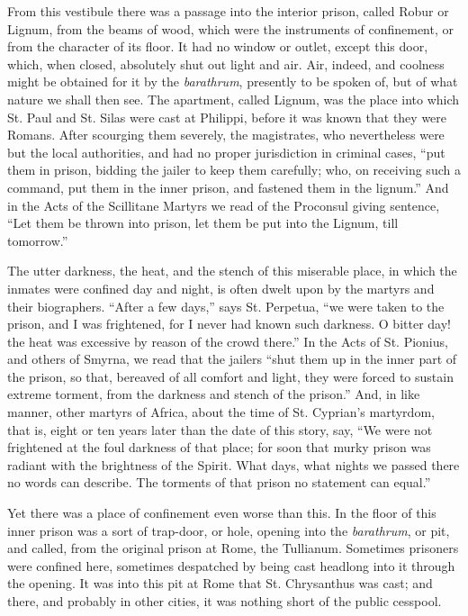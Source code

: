 From this vestibule there was a passage into the interior prison,
called Robur or Lignum, from the beams of wood, which were the
instruments of confinement, or from the character of its floor. It had
no window or outlet, except this door, which, when closed, absolutely
shut out light and air. Air, indeed, and coolness might be obtained
for it by the \emph{barathrum}, presently to be spoken of, but of what
nature we shall then see. The apartment, called Lignum, was the place into which St. Paul and St. Silas were cast at Philippi, before
it was known that they were Romans. After scourging them severely, the
magistrates, who nevertheless were but the local authorities, and had
no proper jurisdiction in criminal cases, ``put them in prison,
bidding the jailer to keep them carefully; who, on receiving such a
command, put them in the inner prison, and fastened them in the
lignum.'' And in the Acts of the Scillitane Martyrs we read of the
Proconsul giving sentence, ``Let them be thrown into prison, let
them be put into the Lignum, till tomorrow.''

The utter darkness, the heat, and the stench of this miserable
place, in which the inmates were confined day and night, is often
dwelt upon by the martyrs and their biographers. ``After a few
days,'' says St. Perpetua, ``we were taken to the prison, and
I was frightened, for I never had known such darkness. O bitter day!
the heat was excessive by reason of the crowd there.'' In the Acts
of St. Pionius, and others of Smyrna, we read that the jailers
``shut them up in the inner part of the prison, so that, bereaved
of all comfort and light, they were forced to sustain extreme torment,
from the darkness and stench of the prison.'' And, in like manner,
other martyrs of Africa, about the time of St. Cyprian's martyrdom,
that is, eight or ten years later than the date of this story, say,
``We were not frightened at the foul darkness of that place; for
soon that murky prison was radiant with the brightness of the Spirit.
What days, what nights we passed there no words can describe.
The torments of that prison no statement can equal.''

Yet there was a place of confinement even worse than this. In the
floor of this inner prison was a sort of trap-door, or hole, opening
into the \emph{barathrum}, or pit, and called, from the original
prison at Rome, the Tullianum. Sometimes prisoners were confined here,
sometimes despatched by being cast headlong into it through the
opening. It was into this pit at Rome that St. Chrysanthus was cast;
and there, and probably in other cities, it was nothing short of the
public cesspool.

